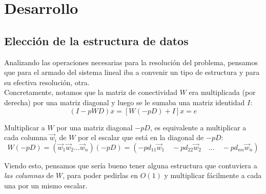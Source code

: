 \section{Desarrollo}


	\subsection{Elección de la estructura de datos}

		Analizando las operaciones necesarias para la resolución del problema, pensamos que para el armado del sistema lineal iba a convenir un tipo de estructura y para su efectiva resolución, otra. \\

		Concretamente, notamos que la matriz de conectividad $W$ era multiplicada (por derecha) por una matriz diagonal y luego se le sumaba una matriz identidad $I$: \\

		\begin{equation}
			(I - pWD) x = [W (-pD) + I] x = e
		\end{equation}

		Multiplicar a $W$ por una matriz diagonal $-pD$, es equivalente a multiplicar a cada columna $\vec{w}_i$ de $W$ por el escalar que está en la diagonal de $-pD$: \\

		\begin{equation}
			W (-pD) = \left( \vec{w}_1 \vec{w}_2 \hdots \vec{w}_n \right) (-pD) = \left( -p d_{11} \vec{w}_1 \quad -p d_{22} \vec{w}_2 \quad \hdots \quad -p d_{nn} \vec{w}_n \right)
		\end{equation}

		Viendo esto, pensamos que sería bueno tener alguna estructura que contuviera a \textit{las columnas} de $W$, para poder pedirlas en $O(1)$ y multiplicar fácilmente a cada una por un mismo escalar. \\

